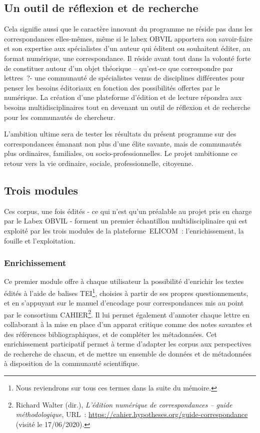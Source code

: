\subsection{Un outil de réflexion et de recherche}

Cela signifie aussi que le caractère innovant du programme ne réside pas dans les correspondances elles-mêmes, même si le labex OBVIL apportera son savoir-faire et son expertise aux spécialistes d’un auteur qui éditent ou souhaitent éditer, au format numérique, une correspondance. Il réside avant tout dans la volonté forte de constituer autour d’un objet théorique – qu’est-ce que correspondre par lettres ?- une communauté de spécialistes venus de disciplines différentes pour penser les besoins éditoriaux en fonction des possibilités offertes par le numérique. La création d’une plateforme d’édition et de lecture répondra aux besoins multidisciplinaires tout en devenant un outil de réflexion et de recherche pour les communautés de chercheur.

L’ambition ultime sera de tester les résultats du présent programme sur des correspondances émanant non plus d’une élite savante, mais de communautés plus ordinaires, familiales, ou socio-professionnelles. Le projet ambitionne ce retour vers la vie ordinaire, sociale, professionnelle, citoyenne. 

\subsection{Trois modules}


Ces corpus, une fois édités - ce qui n’est qu’un préalable au projet pris en charge par le Labex OBVIL - forment un premier échantillon multidisciplinaire qui est exploité par les trois modules de la plateforme ELICOM : l’enrichissement, la fouille et l’exploitation.

\subsubsection{Enrichissement}

Ce premier module offre à chaque utilisateur la possibilité d’enrichir les textes édités à l’aide de balises TEI\footnote{Nous reviendrons sur tous ces termes dans la suite du mémoire.}, choisies à partir de ses propres questionnements, et en s’appuyant sur le manuel d’encodage pour correspondances mis au point par le consortium CAHIER\footnote{ Richard Walter (dir.), \emph{L’édition numérique de correspondances – guide méthodologique}, URL :  \url{https://cahier.hypotheses.org/guide-correspondance} (visité le 17/06/2020).}. Il lui permet également d’annoter chaque lettre en collaborant à la mise en place d’un apparat critique comme des notes savantes et des références bibliographiques, et de compléter les métadonnées.
Cet enrichissement participatif permet à terme d’adapter les corpus aux perspectives de recherche de chacun, et de mettre un ensemble de données et de métadonnées à disposition de la communauté scientifique.

